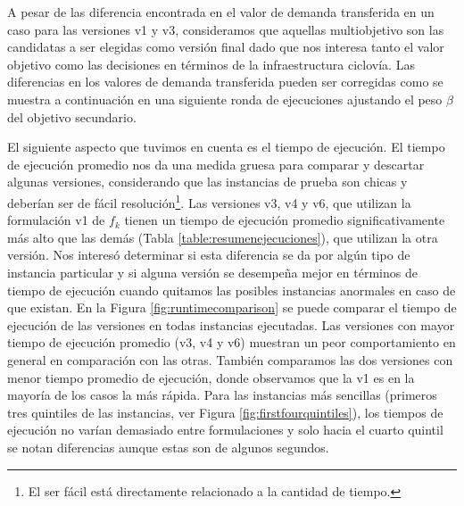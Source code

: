 A pesar de las diferencia encontrada en el valor de demanda transferida en un caso para las versiones v1 y v3, consideramos que aquellas multiobjetivo son las candidatas a ser elegidas como versión final dado que nos interesa tanto el valor objetivo como las decisiones en términos de la infraestructura ciclovía. Las diferencias en los valores de demanda transferida pueden ser corregidas como se muestra a continuación en una siguiente ronda de ejecuciones ajustando el peso $\beta$ del objetivo secundario.

El siguiente aspecto que tuvimos en cuenta es el tiempo de ejecución. El tiempo de ejecución promedio nos da una medida gruesa para comparar y descartar algunas versiones, considerando que las instancias de prueba son chicas y deberían ser de fácil resolución\footnote{El ser fácil está directamente relacionado a la cantidad de tiempo.}. Las versiones v3, v4 y v6, que utilizan la formulación v1 de $f_k$ tienen un tiempo de ejecución promedio significativamente más alto que las demás (Tabla \ref{table:resumenejecuciones}), que utilizan la otra versión. Nos interesó determinar si esta diferencia se da por algún tipo de instancia particular y si alguna versión se desempeña mejor en términos de tiempo de ejecución cuando quitamos las posibles instancias anormales en caso de que existan. En la Figura \ref{fig:runtimecomparison} se puede comparar el tiempo de ejecución de las versiones en todas instancias ejecutadas. Las versiones con mayor tiempo de ejecución promedio (v3, v4 y v6) muestran un peor comportamiento en general en comparación con las otras. También comparamos las dos versiones con menor tiempo promedio de ejecución, donde observamos que la v1 es en la mayoría de los casos la más rápida. Para las instancias más sencillas (primeros tres quintiles de las instancias, ver Figura \ref{fig:firstfourquintiles}), los tiempos de ejecución no varían demasiado entre formulaciones y solo hacia el cuarto quintil se notan diferencias aunque estas son de algunos segundos.

